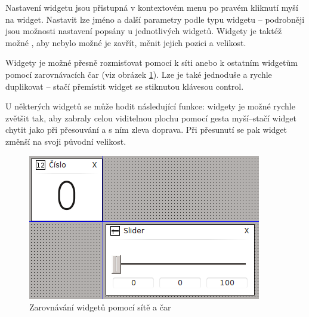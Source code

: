 \documentclass[12pt, a4paper, oneside]{article}
\begin{document}
Nastavení widgetu jsou přistupná v kontextovém menu po pravém kliknutí myší na widget. Nastavit lze jméno a další parametry podle typu widgetu -- podrobněji jsou možnosti nastavení popsány u jednotlivých widgetů. Widgety je taktéž možné , aby nebylo možné je zavřít, měnit jejich pozici a velikost.

Widgety je možné přesně rozmisťovat pomocí  k síti anebo k ostatním widgetům pomocí zarovnávacích čar (viz obrázek \ref{widget_lines}). Lze je také jednoduše a rychle duplikovat -- stačí přemístit widget se stiknutou klávesou control.

U některých widgetů se může hodit následující funkce: widgety je možné rychle zvětšit tak, aby zabraly celou viditelnou plochu pomocí gesta myší--stačí widget chytit jako při přesouvání a  s ním zleva doprava. Při přesunutí se pak widget změnší na svoji původní velikost.

\begin{figure}[H]
\begin{center}
\includegraphics[scale=1]{img/lines.png}
\caption{Zarovnávání widgetů pomocí sítě a čar}
\label{widget_lines}
\end{center}
\end{figure}
\end{document}

